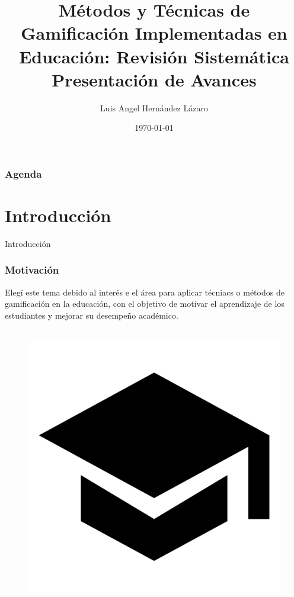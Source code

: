 \documentclass{beamer}
\title[Gamificación]{Métodos y Técnicas de Gamificación Implementadas en Educación: Revisión Sistemática\\ Presentación de Avances} %
\author{Luis Angel Hernández Lázaro} %
\institute[CIMAT] %
{
Centro de Investigación en Matemáticas A.C. Unidad Zacatecas \\ %
\medskip
\textit{luis.hernandez@cimat.com} %
}
\date{\today} %
\begin{document}
\begin{frame}
\titlepage
\end{frame}

\begin{frame}
\frametitle{Agenda}
\tableofcontents 
\end{frame}


\section{Introducción} %

\begin{frame}
\Huge{\centerline{Introducción}}
\end{frame}

\begin{frame}
	\frametitle{Motivación}
	Elegí este tema debido al interés e el área para aplicar técniacs o métodos de gamificación en la educación, con el objetivo de motivar el aprendizaje de los estudiantes y mejorar su desempeño académico.
	\\~\\
	
	\begin{figure}
		\begin{center}
			\includegraphics[scale=0.1]{images/2icons/student.png}
			\label{student}
		\end{center}
	\end{figure}
\end{frame}
\end{document}
